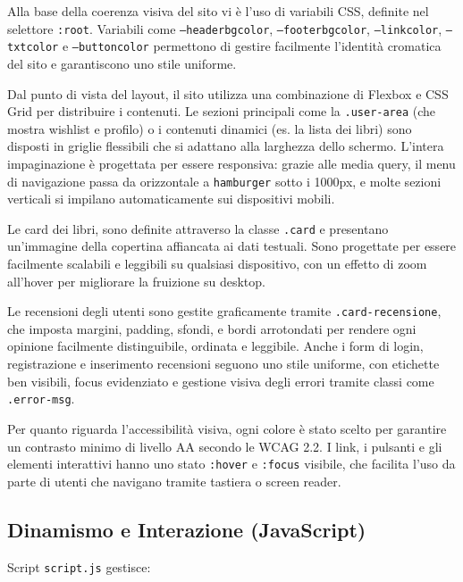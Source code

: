 \documentclass{article}
\begin{document}
\medskip

\noindent
Alla base della coerenza visiva del sito vi è l’uso di variabili CSS, definite nel selettore \texttt{:root}. Variabili come \texttt{--headerbgcolor}, \texttt{--footerbgcolor}, \texttt{--linkcolor}, \texttt{--txtcolor} e \texttt{--buttoncolor} permettono di gestire facilmente l’identità cromatica del sito e garantiscono uno stile uniforme.

Dal punto di vista del layout, il sito utilizza una combinazione di Flexbox e CSS Grid per distribuire i contenuti. Le sezioni principali come la \texttt{.user-area} (che mostra wishlist e profilo) o i contenuti dinamici (es. la lista dei libri) sono disposti in griglie flessibili che si adattano alla larghezza dello schermo. L’intera impaginazione è progettata per essere responsiva: grazie alle media query, il menu di navigazione passa da orizzontale a \texttt{hamburger} sotto i 1000px, e molte sezioni verticali si impilano automaticamente sui dispositivi mobili.

Le card dei libri, sono definite attraverso la classe \texttt{.card} e presentano un’immagine della copertina affiancata ai dati testuali. Sono progettate per essere facilmente scalabili e leggibili su qualsiasi dispositivo, con un effetto di zoom all’hover per migliorare la fruizione su desktop.

Le recensioni degli utenti sono gestite graficamente tramite \texttt{.card-recensione}, che imposta margini, padding, sfondi, e bordi arrotondati per rendere ogni opinione facilmente distinguibile, ordinata e leggibile. Anche i form di login, registrazione e inserimento recensioni seguono uno stile uniforme, con etichette ben visibili, focus evidenziato e gestione visiva degli errori tramite classi come \texttt{.error-msg}.

Per quanto riguarda l’accessibilità visiva, ogni colore è stato scelto per garantire un contrasto minimo di livello AA secondo le WCAG 2.2. I link, i pulsanti e gli elementi interattivi hanno uno stato \texttt{:hover} e \texttt{:focus} visibile, che facilita l’uso da parte di utenti che navigano tramite tastiera o screen reader.

\medskip




\subsection{Dinamismo e Interazione (JavaScript)}
Script \texttt{script.js} gestisce:
\end{document}
